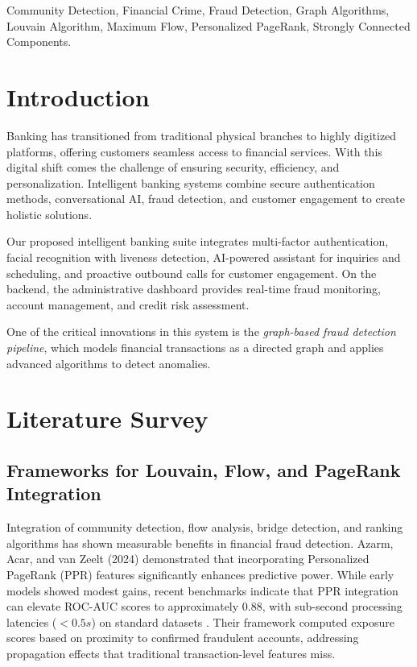 \documentclass[lettersize,journal]{IEEEtran}
\begin{document}
\begin{IEEEkeywords}
Community Detection, Financial Crime, Fraud Detection, Graph Algorithms, Louvain Algorithm, Maximum Flow, Personalized PageRank, Strongly Connected Components.
\end{IEEEkeywords}

\section{Introduction}
Banking has transitioned from traditional physical branches to highly digitized platforms, offering customers seamless access to financial services. With this digital shift comes the challenge of ensuring security, efficiency, and personalization. Intelligent banking systems combine secure authentication methods, conversational AI, fraud detection, and customer engagement to create holistic solutions.

Our proposed intelligent banking suite integrates multi-factor authentication, facial recognition with liveness detection, AI-powered assistant for inquiries and scheduling, and proactive outbound calls for customer engagement. On the backend, the administrative dashboard provides real-time fraud monitoring, account management, and credit risk assessment.

One of the critical innovations in this system is the \textit{graph-based fraud detection pipeline}, which models financial transactions as a directed graph and applies advanced algorithms to detect anomalies.
 
\section{Literature Survey}
\subsection{Frameworks for Louvain, Flow, and PageRank Integration}

Integration of community detection, flow analysis, bridge detection, and ranking algorithms has shown measurable benefits in financial fraud detection. Azarm, Acar, and van Zeelt (2024) demonstrated that incorporating Personalized PageRank (PPR) features significantly enhances predictive power. While early models showed modest gains, recent benchmarks indicate that PPR integration can elevate ROC-AUC scores to approximately 0.88, with sub-second processing latencies ($<0.5s$) on standard datasets \cite{azarm2024ppr}. Their framework computed exposure scores based on proximity to confirmed fraudulent accounts, addressing propagation effects that traditional transaction-level features miss.
\end{document}
